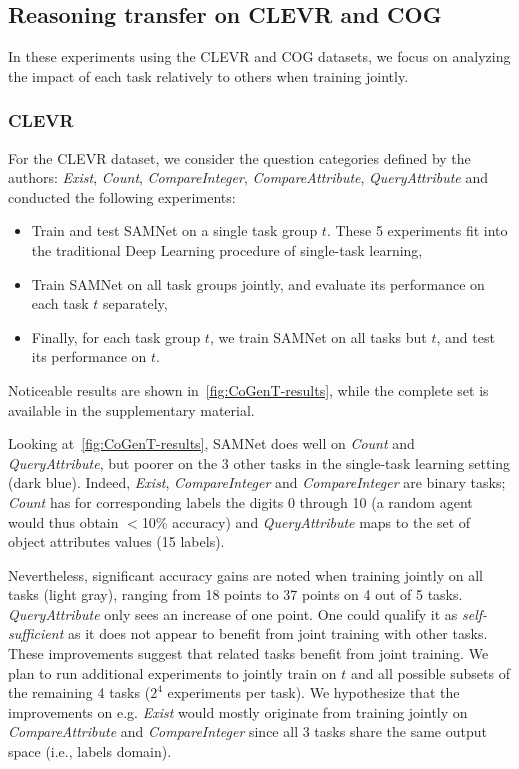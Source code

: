 \subsection{Reasoning transfer on CLEVR and COG}
\label{sec:reasoning}
In these experiments using the CLEVR and COG datasets, we focus on analyzing the impact 
of each task relatively to others when training jointly.

\subsubsection{CLEVR}
\label{sec:reasoning-clevr}
For the CLEVR dataset, we consider the question categories defined by the authors: \textit{Exist}, \textit{Count}, \textit{CompareInteger}, \textit{CompareAttribute}, \textit{QueryAttribute} and conducted the following experiments:
\begin{itemize}
	\compresslist
	\item Train and test SAMNet on a single task group $t$. These 5 experiments fit into the traditional Deep Learning procedure of single-task learning,
	\item Train SAMNet on all task groups jointly, and evaluate its performance on each task $t$ separately,
	\item Finally, for each task group $t$, we train SAMNet on all tasks but $t$, and test its performance on $t$. %
\end{itemize}

Noticeable results are shown in~\cref{fig:CoGenT-results}, while the complete set is available in the supplementary material.%


Looking at~\cref{fig:CoGenT-results}, SAMNet does well on \textit{Count} and \textit{QueryAttribute}, but poorer on the 3 other tasks in the single-task learning setting (dark blue). Indeed, \textit{Exist}, \textit{CompareInteger} and \textit{CompareInteger} are binary tasks; \textit{Count} has for corresponding labels the digits 0 through 10 (a random agent would thus obtain $<$10\% accuracy) and \textit{QueryAttribute} maps to the set of object attributes values (15 labels).

Nevertheless, significant accuracy gains are noted when training jointly on all tasks (light gray), ranging from 18 points to 37 points on 4 out of 5 tasks. \textit{QueryAttribute} only sees an increase of one point. One could qualify it as \textit{self-sufficient} as it does not appear to benefit from joint training with other tasks. These improvements suggest that related tasks benefit from joint training.
We plan to run additional experiments to jointly train on $t$ and all possible subsets of the remaining 4 tasks ($2^4$ experiments per task). We hypothesize that the improvements on e.g. \textit{Exist} would mostly originate from training jointly on \textit{CompareAttribute} and \textit{CompareInteger} since all 3 tasks share the same output space (i.e., labels domain).

